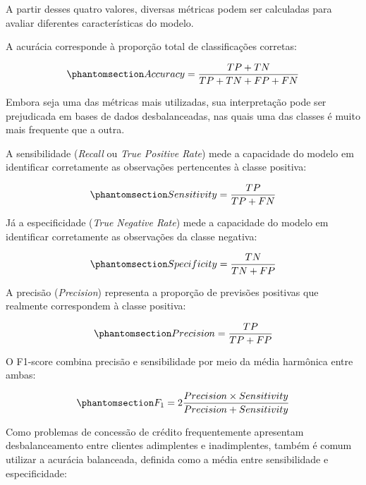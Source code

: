 \documentclass[
  brazilian,
  12pt,
  letterpaper,
  DIV=11,
  numbers=noendperiod]{scrartcl}
\begin{document}
A partir desses quatro valores, diversas métricas podem ser calculadas
para avaliar diferentes características do modelo.

A acurácia corresponde à proporção total de classificações corretas:

\begin{equation}\protect\phantomsection\label{eq-accuracy}{
Accuracy=
\frac{TP+TN}
{TP+TN+FP+FN}
}\end{equation}

Embora seja uma das métricas mais utilizadas, sua interpretação pode ser
prejudicada em bases de dados desbalanceadas, nas quais uma das classes
é muito mais frequente que a outra.

A sensibilidade (\emph{Recall} ou \emph{True Positive Rate}) mede a
capacidade do modelo em identificar corretamente as observações
pertencentes à classe positiva:

\begin{equation}\protect\phantomsection\label{eq-sensitivity}{
Sensitivity=
\frac{TP}
{TP+FN}
}\end{equation}

Já a especificidade (\emph{True Negative Rate}) mede a capacidade do
modelo em identificar corretamente as observações da classe negativa:

\begin{equation}\protect\phantomsection\label{eq-specificity}{
Specificity=
\frac{TN}
{TN+FP}
}\end{equation}

A precisão (\emph{Precision}) representa a proporção de previsões
positivas que realmente correspondem à classe positiva:

\begin{equation}\protect\phantomsection\label{eq-precision}{
Precision=
\frac{TP}
{TP+FP}
}\end{equation}

O F1-score combina precisão e sensibilidade por meio da média harmônica
entre ambas:

\begin{equation}\protect\phantomsection\label{eq-f1}{
F_1=
2
\frac{Precision\times Sensitivity}
{Precision+Sensitivity}
}\end{equation}

Como problemas de concessão de crédito frequentemente apresentam
desbalanceamento entre clientes adimplentes e inadimplentes, também é
comum utilizar a acurácia balanceada, definida como a média entre
sensibilidade e especificidade:
\end{document}
